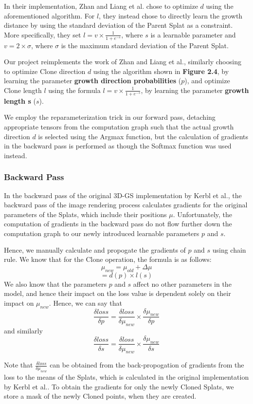 \documentclass[11pt]{report}
\begin{document}
In their implementation, Zhan and Liang et al. chose to optimize $d$ using the aforementioned algorithm. For $l$, they instead chose to directly learn the growth distance by using the standard deviation of the Parent Splat as a constraint. More specifically, they set $l = v \times \frac{1}{1 + e^{-s}}$, where $s$ is a learnable parameter and $v = 2 \times \sigma$, where $\sigma$ is the maximum standard deviation of the Parent Splat.

Our project reimplements the work of Zhan and Liang et al., similarly choosing to optimize Clone direction $d$ using the algorithm shown in \textbf{Figure 2.4}, by learning the parameter \textbf{growth direction probabilities} ($p$), and optimize Clone length $l$ using the formula $l = v \times \frac{1}{1 + e^{-s}}$, by learning the parameter \textbf{growth length s} ($s$).

We employ the reparameterization trick in our forward pass, detaching appropriate tensors from the computation graph such that the actual growth direction $d$ is selected using the Argmax function, but the calculation of gradients in the backward pass is performed as though the Softmax function was used instead.

\subsubsection{Backward Pass}
In the backward pass of the original 3D-GS implementation by Kerbl et al., the backward pass of the image rendering process calculates gradients for the original parameters of the Splats, which include their positions $\mu$. Unfortunately, the computation of gradients in the backward pass do not flow further down the computation graph to our newly introduced learnable parameters $p$ and $s$.

Hence, we manually calculate and propogate the gradients of $p$ and $s$ using chain rule. We know that for the Clone operation, the formula is as follows:
\[ \mu_{new} = \mu_{old} + \Delta \mu  \]
\[ = d(p) \times l(s) \]
We also know that the parameters $p$ and $s$ affect no other parameters in the model, and hence their impact on the loss value is dependent solely on their impact on $\mu_{new}$. Hence, we can say that
\[ \frac{\delta loss}{\delta p} = \frac{\delta loss}{\delta \mu_{new}} \times \frac{\delta \mu_{new}}{\delta p} \]
and similarly
\[ \frac{\delta loss}{\delta s} = \frac{\delta loss}{\delta \mu_{new}} \times \frac{\delta \mu_{new}}{\delta s} \]

Note that $\frac{\delta loss}{\delta \mu_{new}}$ can be obtained from the back-propogation of gradients from the loss to the means of the Splats, which is calculated in the original implementation by Kerbl et al.. To obtain the gradients for only the newly Cloned Splats, we store a mask of the newly Cloned points, when they are created.
\end{document}
